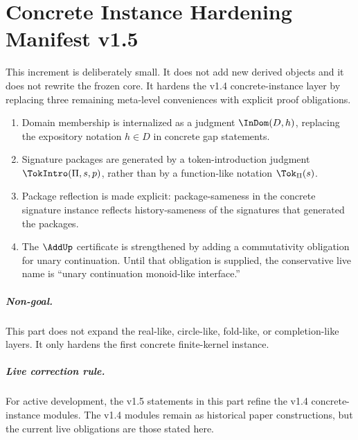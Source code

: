 \chapter{Concrete Instance Hardening Manifest v1.5}
\label{ch:v15-manifest}

This increment is deliberately small. It does not add new derived objects and it does not rewrite the frozen core. It hardens the v1.4 concrete-instance layer by replacing three remaining meta-level conveniences with explicit proof obligations.

\begin{enumerate}
  \item Domain membership is internalized as a judgment \(\InDom(D,h)\), replacing the expository notation \(h\in D\) in concrete gap statements.
  \item Signature packages are generated by a token-introduction judgment \(\TokIntro(\Pi,s,p)\), rather than by a function-like notation \(\Tok_{\Pi}(s)\).
  \item Package reflection is made explicit: package-sameness in the concrete signature instance reflects history-sameness of the signatures that generated the packages.
  \item The \(\AddUp\) certificate is strengthened by adding a commutativity obligation for unary continuation. Until that obligation is supplied, the conservative live name is ``unary continuation monoid-like interface.''
\end{enumerate}

\paragraph{Non-goal.}
This part does not expand the real-like, circle-like, fold-like, or completion-like layers. It only hardens the first concrete finite-kernel instance.

\paragraph{Live correction rule.}
For active development, the v1.5 statements in this part refine the v1.4 concrete-instance modules. The v1.4 modules remain as historical paper constructions, but the current live obligations are those stated here.
